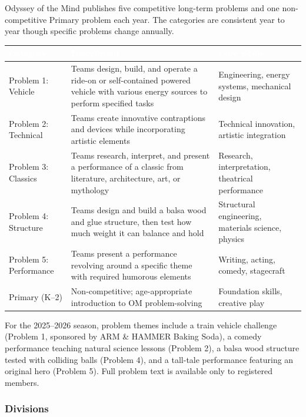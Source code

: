 \documentclass[11pt,letterpaper]{article}
\newcommand{\tableheader}[1]{\textbf{\sffamily\textcolor{white}{#1}}}
\begin{document}
Odyssey of the Mind publishes five competitive long-term problems and one non-competitive Primary problem each year. The categories are consistent year to year though specific problems change annually.

\begin{center}
\begin{tabularx}{\textwidth}{L{2.5cm}XL{3cm}}
\toprule
{}
\tableheader{Category} & \tableheader{Description} & \tableheader{Core Skills} \\
\midrule
Problem 1: Vehicle & Teams design, build, and operate a ride-on or self-contained powered vehicle with various energy sources to perform specified tasks & Engineering, energy systems, mechanical design \\
Problem 2: Technical & Teams create innovative contraptions and devices while incorporating artistic elements & Technical innovation, artistic integration \\
Problem 3: Classics & Teams research, interpret, and present a performance of a classic from literature, architecture, art, or mythology & Research, interpretation, theatrical performance \\
Problem 4: Structure & Teams design and build a balsa wood and glue structure, then test how much weight it can balance and hold & Structural engineering, materials science, physics \\
Problem 5: Performance & Teams present a performance revolving around a specific theme with required humorous elements & Writing, acting, comedy, stagecraft \\
Primary (K--2) & Non-competitive; age-appropriate introduction to OM problem-solving & Foundation skills, creative play \\
\bottomrule
\end{tabularx}
\end{center}

For the 2025--2026 season, problem themes include a train vehicle challenge (Problem 1, sponsored by ARM \& HAMMER Baking Soda), a comedy performance teaching natural science lessons (Problem 2), a balsa wood structure tested with colliding balls (Problem 4), and a tall-tale performance featuring an original hero (Problem 5). Full problem text is available only to registered members.

\subsubsection{Divisions}
\end{document}
